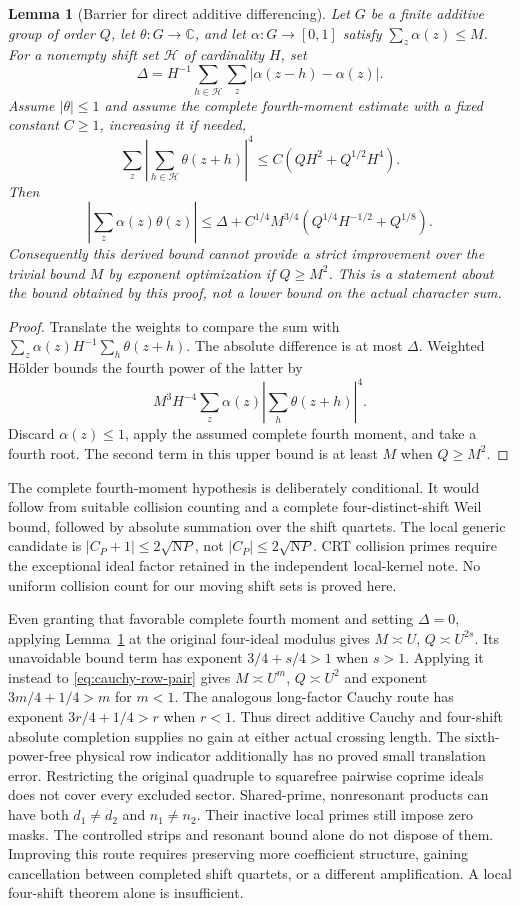 \documentclass[11pt]{article}
\newtheorem{lemma}{Lemma}
\newcommand{\N}{\mathrm N}
\begin{document}
\begin{lemma}[Barrier for direct additive differencing]\label{lem:differencing}
Let $G$ be a finite additive group of order $Q$, let
$\theta:G\to\mathbb C$, and let $\alpha:G\to[0,1]$ satisfy
$\sum_z\alpha(z)\le M$.
For a nonempty shift set $\mathcal H$ of cardinality $H$, set
\[
 \Delta=H^{-1}\sum_{h\in\mathcal H}\sum_z
                  |\alpha(z-h)-\alpha(z)|.
\]
Assume $|\theta|\le1$ and assume the complete fourth-moment estimate
with a fixed constant $C\ge1$, increasing it if needed,
\[
 \sum_z\left|\sum_{h\in\mathcal H}\theta(z+h)\right|^4
 \le C(QH^2+Q^{1/2}H^4).
\]
Then
\[
 \left|\sum_z\alpha(z)\theta(z)\right|
 \le \Delta+C^{1/4}M^{3/4}
          (Q^{1/4}H^{-1/2}+Q^{1/8}).
\]
Consequently this derived bound cannot provide a strict improvement
over the trivial bound $M$ by exponent optimization if $Q\ge M^2$.
This is a statement about the bound obtained by this proof, not a
lower bound on the actual character sum.
\end{lemma}
\begin{proof}
Translate the weights to compare the sum with
$\sum_z\alpha(z)H^{-1}\sum_h\theta(z+h)$.
The absolute difference is at most $\Delta$.
Weighted H\"older bounds the fourth power of the latter by
\[
 M^3 H^{-4}\sum_z\alpha(z)
                \left|\sum_h\theta(z+h)\right|^4.
\]
Discard $\alpha(z)\le1$, apply the assumed complete fourth moment,
and take a fourth root. The second term in this upper bound is at least $M$
when $Q\ge M^2$.
\end{proof}

The complete fourth-moment hypothesis is deliberately conditional.
It would follow from suitable collision counting and a complete
four-distinct-shift Weil bound, followed by absolute summation over the
shift quartets. The local generic candidate is
$|C_P+1|\le2\sqrt{\N P}$, not $|C_P|\le2\sqrt{\N P}$.
CRT collision primes require the exceptional ideal factor retained in
the independent local-kernel note. No uniform collision count for our
moving shift sets is proved here.

Even granting that favorable complete fourth moment and setting
$\Delta=0$, applying Lemma~\ref{lem:differencing} at the original
four-ideal modulus gives $M\asymp U$, $Q\asymp U^{2s}$.
Its unavoidable bound term has exponent $3/4+s/4>1$ when $s>1$.
Applying it instead to \eqref{eq:cauchy-row-pair} gives
$M\asymp U^m$, $Q\asymp U^2$ and exponent $3m/4+1/4>m$ for $m<1$.
The analogous long-factor Cauchy route has exponent
$3r/4+1/4>r$ when $r<1$.
Thus direct additive Cauchy and four-shift absolute completion supplies
no gain at either actual crossing length. The sixth-power-free physical
row indicator additionally has no proved small translation error.
Restricting the original quadruple to squarefree pairwise coprime ideals
does not cover every excluded sector. Shared-prime, nonresonant products
can have both $d_1\ne d_2$ and $n_1\ne n_2$.
Their inactive local primes still impose zero masks.
The controlled strips and resonant bound alone do not dispose of them.
Improving this route requires preserving more coefficient structure,
gaining cancellation between completed shift quartets, or a different
amplification. A local four-shift theorem alone is insufficient.
\end{document}
